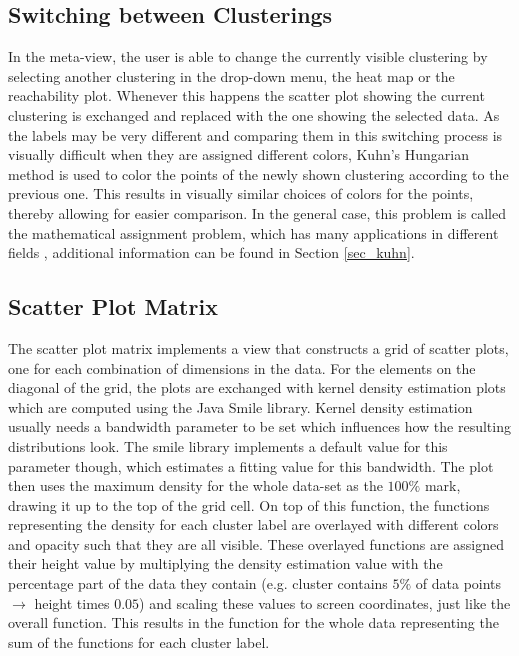 \documentclass[
	a4paper,
	english,
	twoside,
	openright,               
	11pt                            
	]{report}
\begin{document}
\subsection{Switching between Clusterings}

In the meta-view, the user is able to change the currently visible clustering by selecting another clustering in the drop-down menu, the heat map or the reachability plot. Whenever this happens the scatter plot showing the current clustering is exchanged and replaced with the one showing the selected data. As the labels may be very different and comparing them in this switching process is visually difficult when they are assigned different colors, Kuhn’s Hungarian method \cite{Kuhn2010} is used to color the points of the newly shown clustering according to the previous one. This results in visually similar choices of colors for the points, thereby allowing for easier comparison. In the general case, this problem is called the mathematical assignment problem, which has many applications in different fields \cite{Kuhn2010}, additional information can be found in Section \ref{sec_kuhn}.

\subsection{Scatter Plot Matrix}

The scatter plot matrix implements a view that constructs a grid of scatter plots, one for each combination of dimensions in the data. For the elements on the diagonal of the grid, the plots are exchanged with kernel density estimation plots which are computed using the Java Smile \cite{javasmile} library. Kernel density estimation usually needs a bandwidth parameter to be set which influences how the resulting distributions look. The smile library implements a default value for this parameter though, which estimates a fitting value for this bandwidth. The plot then uses the maximum density for the whole data-set as the $100\% $ mark, drawing it up to the top of the grid cell. On top of this function, the functions representing the density for each cluster label are overlayed with different colors and opacity such that they are all visible. These overlayed functions are assigned their height value by multiplying the density estimation value with the percentage part of the data they contain (e.g. cluster contains $5\% $ of data points $\rightarrow$ height times $0.05$) and scaling these values to screen coordinates, just like the overall function. This results in the function for the whole data representing the sum of the functions for each cluster label.
\end{document}
